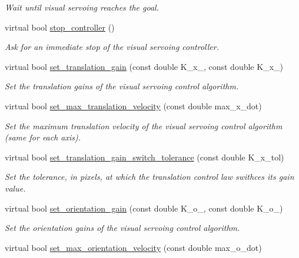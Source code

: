 \begin{DoxyCompactItemize}
\begin{DoxyCompactList}\small\item\em Wait until visual servoing reaches the goal. \end{DoxyCompactList}\item 
virtual bool \hyperlink{classVisualServoingIDL_ac8909c1f4d5eb4cd1ab010fb3dcd7efb}{stop\+\_\+controller} ()
\begin{DoxyCompactList}\small\item\em Ask for an immediate stop of the visual servoing controller. \end{DoxyCompactList}\item 
virtual bool \hyperlink{classVisualServoingIDL_a49034ed3c3d7b150ea0edb984217af31}{set\+\_\+translation\+\_\+gain} (const double K\+\_\+x\+\_, const double K\+\_\+x\+\_)
\begin{DoxyCompactList}\small\item\em Set the translation gains of the visual servoing control algorithm. \end{DoxyCompactList}\item 
virtual bool \hyperlink{classVisualServoingIDL_af928c1409ad82c6b5fa1aff93ef9d0c4}{set\+\_\+max\+\_\+translation\+\_\+velocity} (const double max\+\_\+x\+\_\+dot)
\begin{DoxyCompactList}\small\item\em Set the maximum translation velocity of the visual servoing control algorithm (same for each axis). \end{DoxyCompactList}\item 
virtual bool \hyperlink{classVisualServoingIDL_ad7800969fdb9a88cce5e59552fca8b1f}{set\+\_\+translation\+\_\+gain\+\_\+switch\+\_\+tolerance} (const double K\+\_\+x\+\_\+tol)
\begin{DoxyCompactList}\small\item\em Set the tolerance, in pixels, at which the translation control law swithces its gain value. \end{DoxyCompactList}\item 
virtual bool \hyperlink{classVisualServoingIDL_a63069a57bf0a190f0d76b5c0eba694fb}{set\+\_\+orientation\+\_\+gain} (const double K\+\_\+o\+\_, const double K\+\_\+o\+\_)
\begin{DoxyCompactList}\small\item\em Set the orientation gains of the visual servoing control algorithm. \end{DoxyCompactList}\item 
virtual bool \hyperlink{classVisualServoingIDL_ad2495422c8f1dda27b85db96c42a7042}{set\+\_\+max\+\_\+orientation\+\_\+velocity} (const double max\+\_\+o\+\_\+dot)

\end{DoxyCompactItemize}
